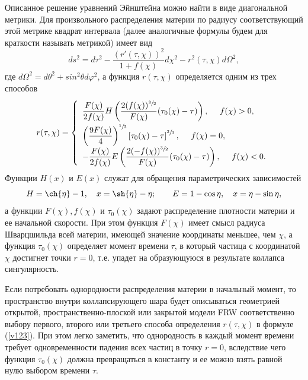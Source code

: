 \documentclass[12pt]{article}
\newcommand{\bq}{\begin{equation}}
\newcommand{\eq}{\end{equation}}
\begin{document}
Описанное решение уравнений Эйнштейна можно найти в виде диагональной метрики. Для произвольного распределения материи по радиусу
соответствующий этой метрике квадрат интервала (далее аналогичные формулы будем для краткости называть метрикой) имеет вид \cite{landavshic2}
\bq
\label{metric}
	d s^2 = d \tau^2 - \frac{(r'(\tau, \chi))^2}{1+f(\chi)} d\chi^2 - r^2(\tau, \chi) d \Omega^2,
\eq
где $d\Omega^2=d\theta^2+sin^2\theta d\varphi^2$, а
функция $r(\tau, \chi)$ определяется одним из трех способов
\bq
\label{v123}
	r(\tau, \chi) = \left\{
	\begin{array}{l}
	\vphantom{\Biggr(}
    \dfrac{F(\chi)}{2 f(\chi)} H \left( \dfrac{2(f(\chi))^{\sfrac{3}{2}} }{F(\chi)}(\tau_0(\chi)-\tau)  \right) , \ \ \ \ f(\chi) > 0,\\
	\left( \dfrac{9F(\chi)}{4} \right)^{\sfrac{1}{3}} \left[ \tau_0(\chi)- \tau \right]^{\sfrac{2}{3}}, \ \ \ \ f(\chi) = 0, \\
	- \dfrac{F(\chi)}{2 f(\chi)} E \left( \dfrac{2(-f(\chi))^{\sfrac{3}{2}} }{F(\chi)}(\tau_0(\chi)-\tau) \right), \ \ \ \ f(\chi) < 0.
	\end{array} \right.
\eq
Функции $H(x)$ и $E(x)$ служат для обращения параметрических зависимостей
\bq\label{sp4}
H = \ch{\eta}-1,\quad x = \sh{\eta} - \eta;\qquad
E = 1 - \cos{\eta},\quad x = \eta - \sin{\eta},
\eq
а функции $F(\chi), f(\chi)$ и $\tau_0(\chi)$ задают распределение плотности материи и ее начальной скорости.
При этом функция $F(\chi)$ имеет смысл радиуса Шварцшильда всей материи, имеющей значение координаты меньшее, чем $\chi$,
а функция $\tau_0(\chi)$ определяет момент времени $\tau$, в который частица с координатой $\chi$
достигнет точки $r=0$, т.е. упадет на образующуюся в результате коллапса сингулярность.

Если потребовать однородности распределения материи в начальный момент, то пространство внутри коллапсирующего шара будет описываться геометрией открытой, пространственно-плоской или закрытой модели FRW соответственно выбору первого, второго или третьего способа определения $r(\tau, \chi)$ в формуле (\ref{v123}).
При этом легко заметить, что однородность в каждый момент времени требует одновременности падения всех частиц
в точку $r=0$, вследствие чего функция $\tau_0(\chi)$ должна превращаться в константу и ее можно взять равной нулю выбором времени $\tau$.
\end{document}
